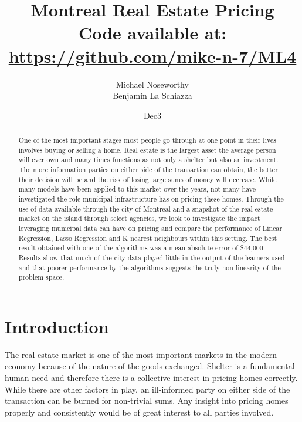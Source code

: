\documentclass{acm_proc_article-sp}
\begin{document}
\title{Montreal Real Estate Pricing \\
{\normalsize Code available at: \url{https://github.com/mike-n-7/ML4}}} 
\subtitle{}

\author{
\alignauthor 
Michael Noseworthy \\
\alignauthor Benjamin La Schiazza\\
}

\date{Dec3}

\maketitle
\begin{abstract} %

	One of the most important stages most people go through at one point in their lives involves buying or selling a home.  Real estate is the largest asset the average person will ever own and many times functions as not only a shelter but also an investment. The more information parties on either side of the transaction can obtain, the better their decision will be and the risk of losing large sums of money will decrease. While many models have been applied to this market over the years, not many have investigated the role municipal infrastructure has on pricing these homes. Through the use of data available through the city of Montreal and a snapshot of the real estate market on the island through select agencies, we look to investigate the impact leveraging municipal data can have on pricing and compare the performance of Linear Regression, Lasso Regression and K nearest neighbours within this setting. The best result obtained with one of the algorithms was a mean absolute error of \$44,000. Results show that much of the city data played little in the output of the learners used and that poorer performance by the algorithms suggests the truly non-linearity of the problem space.
	
\end{abstract}

\section{Introduction} %

	The real estate market is one of the most important markets in the modern economy because of the nature of the goods exchanged. Shelter is a fundamental human need and therefore there is a collective interest in pricing homes correctly. While there are other factors in play, an ill-informed party on either side of the transaction can be burned for non-trivial sums. Any insight into pricing homes properly and consistently would be of great interest to all parties involved. 
	
\end{document}
